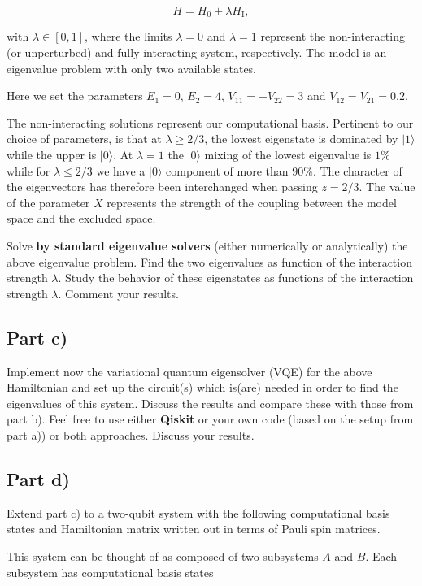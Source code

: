 \documentclass[%
oneside,                 %
final,                   %
10pt]{article}
\begin{document}
\[
H=H_0+\lambda H_\mathrm{I},
\]

with $\lambda \in [0,1]$, where the limits $\lambda=0$ and $\lambda=1$
represent the non-interacting (or unperturbed) and fully interacting
system, respectively.  The model is an eigenvalue problem with only
two available states.

Here we set the parameters $E_1=0$,
$E_2=4$, $V_{11}=-V_{22}=3$ and $V_{12}=V_{21}=0.2$.

The non-interacting solutions represent our computational basis.
Pertinent to our choice of parameters, is that at $\lambda\geq 2/3$,
the lowest eigenstate is dominated by $\vert 1\rangle$ while the upper
is $\vert 0 \rangle$. At $\lambda=1$ the $\vert 0 \rangle$ mixing of
the lowest eigenvalue is $1\%$ while for $\lambda\leq 2/3$ we have a
$\vert 0 \rangle$ component of more than $90\%$.  The character of the
eigenvectors has therefore been interchanged when passing $z=2/3$. The
value of the parameter $X$ represents the strength of the coupling
between the model space and the excluded space.

Solve \textbf{by standard eigenvalue solvers} (either numerically or analytically) the above eigenvalue problem.
Find the two eigenvalues as function of the interaction strength $\lambda$.
Study the behavior of these eigenstates as functions of the interaction strength $\lambda$.
Comment your results.

\subsection{Part c)}

Implement now the variational quantum eigensolver (VQE) for the above
Hamiltonian and set up the circuit(s) which is(are) needed in order to find
the eigenvalues of this system. Discuss the results and compare these
with those from part b). Feel free to use either \textbf{Qiskit} or your own
code (based on the setup from part a)) or both approaches. Discuss
your results.

\subsection{Part d)}

Extend part c) to a two-qubit system with the following computational
basis states and Hamiltonian matrix written out in terms of Pauli spin
matrices.

This system can be thought of as composed of two subsystems
$A$ and $B$. Each subsystem has computational basis states
\end{document}
